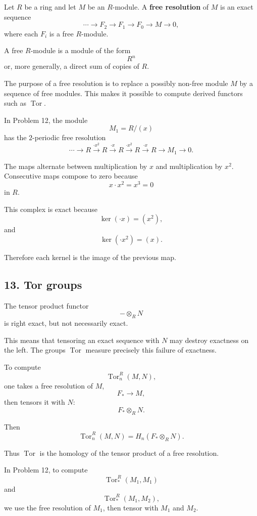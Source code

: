 \documentclass[12pt,a4paper]{article}
\theoremstyle{notespace}
\begin{document}
Let \(R\) be a ring and let \(M\) be an \(R\)-module. A \textbf{free resolution} of \(M\) is an exact sequence
\[
\cdots
\longrightarrow
F_2
\longrightarrow
F_1
\longrightarrow
F_0
\longrightarrow
M
\longrightarrow
0,
\]
where each \(F_i\) is a free \(R\)-module.

A free \(R\)-module is a module of the form
\[
R^n
\]
or, more generally, a direct sum of copies of \(R\).

The purpose of a free resolution is to replace a possibly non-free module \(M\) by a sequence of free modules. This makes it possible to compute derived functors such as \(\operatorname{Tor}\).

In Problem 12, the module
\[
M_1=R/(x)
\]
has the \(2\)-periodic free resolution
\[
\cdots
\longrightarrow
R
\xrightarrow{\cdot x^2}
R
\xrightarrow{\cdot x}
R
\xrightarrow{\cdot x^2}
R
\xrightarrow{\cdot x}
R
\longrightarrow
M_1
\longrightarrow
0.
\]

The maps alternate between multiplication by \(x\) and multiplication by \(x^2\). Consecutive maps compose to zero because
\[
x\cdot x^2=x^3=0
\]
in \(R\).

This complex is exact because
\[
\ker(\cdot x)=(x^2),
\]
and
\[
\ker(\cdot x^2)=(x).
\]

Therefore each kernel is the image of the previous map.

\subsection*{13. Tor groups}

The tensor product functor
\[
-\otimes_R N
\]
is right exact, but not necessarily exact.

This means that tensoring an exact sequence with \(N\) may destroy exactness on the left. The groups \(\operatorname{Tor}\) measure precisely this failure of exactness.

To compute
\[
\operatorname{Tor}_n^R(M,N),
\]
one takes a free resolution of \(M\),
\[
F_*\to M,
\]
then tensors it with \(N\):
\[
F_*\otimes_R N.
\]

Then
\[
\operatorname{Tor}_n^R(M,N)
=
H_n(F_*\otimes_R N).
\]

Thus \(\operatorname{Tor}\) is the homology of the tensor product of a free resolution.

In Problem 12, to compute
\[
\operatorname{Tor}_*^R(M_1,M_1)
\]
and
\[
\operatorname{Tor}_*^R(M_1,M_2),
\]
we use the free resolution of \(M_1\), then tensor with \(M_1\) and \(M_2\).
\end{document}
